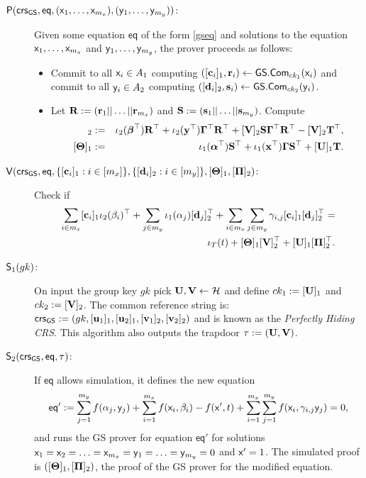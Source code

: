 \begin{description}
\item[$\mathsf{P}(\mathsf{crs}_{\mathsf{GS}},\mathsf{eq},(\mathsf{x}_1,\ldots,\mathsf{x}_{m_x}),(\mathsf{y}_1,\ldots,\mathsf{y}_{m_y}))$:] Given some equation $\mathsf{eq}$ of the form \ref{gseq} and solutions to the equation
$\mathsf{x}_1,\ldots,\mathsf{x}_{m_x}$ and $\mathsf{y}_1,\ldots,\mathsf{y}_{m_y}$, the prover proceeds as follows:
\begin{itemize}
\item Commit to all $\mathsf{x}_i \in A_1$ computing $([\mathbf{c}_i]_1,\mathbf{r}_i)\gets{\mathsf{GS}}.\mathsf{Com}_{ck_1}(\mathsf{x}_i)$ and commit to all $\mathsf{y}_i \in A_2$ computing $([\mathbf{d}_i]_2,\mathbf{s}_i)\gets{\mathsf{GS}}.\mathsf{Com}_{ck_2}(\mathsf{y}_i)$.
\item Let $\mathbf{{R}} := (\mathbf{r}_1||\ldots||\mathbf{r}_{m_x})$ and $\mathbf{{S}} := (\mathbf{s}_1||\ldots||\mathbf{s}_{m_y})$. Compute 
\begin{eqnarray*}
[\matr{\Pi}]_2 
& := & \iota_2(\boldsymbol \beta^{\top}) \matr{R}^\top +\iota_2(\vecb{y}^{\top}) \matr{\EscQE}^\top  \matr{R}^{\top}+
[\matr{V}]_2\matr{S} \matr{\EscQE}^\top \matr{R}^\top - [\matr{V}]_2 \matr{T}^\top,\\
\  [\matr{\Theta}]_1 &  := &\iota_1(\boldsymbol \alpha^{\top}) \matr{S}^\top +\iota_1(\vecb{x}^{\top}) \matr{\EscQE} \matr{S}^{\top}+ [\matr{U}]_1 \matr{T}.
 \end{eqnarray*}
\end{itemize}
\item[{$\mathsf{V}(\mathsf{crs}_{\mathsf{GS}},\mathsf{eq},\{[\mathbf{c}_i]_1:i\in[m_x]\},\{[\mathbf{d}_i]_2:i\in[m_y]\},[\mathbf{{\Theta}}]_1,[\mathbf{{\Pi}}]_2)$}:] Check if
\begin{eqnarray*}
\sum_{i \in m_x} [\mathbf{c}_i]_1 \iota_2(\beta_i)^{\top} + \sum_{j \in m_y} \iota_1(\alpha_j) [\mathbf{d}_j]_2^{\top} 
+ \sum_{i \in m_x}\sum_{j \in m_y}\gamma_{i,j} [\mathbf{c}_i]_1 [\mathbf{d}_j]_2^{\top} = \\ \iota_T(t) +[\mathbf{{\Theta}}]_1[\mathbf{{V}}]_2^\top + [\mathbf{{U}}]_1[\mathbf{{\Pi}}]_2^\top.
\end{eqnarray*}
\item[$\mathsf{S}_1(gk)$:]  On input the group key $gk$ pick $\mathbf{{U}},\mathbf{{V}}\gets\mathcal{H}$ and define $ck_1 := [\mathbf{{U}}]_1$ and $ck_2:=[\mathbf{{V}}]_2$.
   The common reference string is:
   $\mathsf{crs}_{\mathsf{GS}}:=(gk,[\mathbf{u}_1]_1,[\mathbf{u}_2]_1,[\mathbf{v}_1]_2,[\mathbf{v}_2]_2)$ and is known as the \emph{Perfectly Hiding CRS}. This algorithm also outputs the trapdoor $\tau:=(\mathbf{{U}},\mathbf{{V}})$.
\item[$\mathsf{S}_2(\mathsf{crs}_{\mathsf{GS}},\mathsf{eq},\tau)$:] If $\mathsf{eq}$ allows simulation, it defines the new equation
\begin{equation}
\mathsf{eq}':=\sum_{j=1}^{m_y} f(\alpha_j, \mathsf{y}_j)+\sum_{i=1}^{m_x} f(\mathsf{x}_i, \beta_i)-f(\mathsf{x}',t)+\sum_{i=1}^{m_x} \sum_{j=1}^{m_y}  f(\mathsf{x}_i,\gamma_{i,j} \mathsf{y}_j)=0,
\end{equation}
and runs the GS prover for equation $\mathsf{eq}'$ for solutions $\mathsf{x}_1=\mathsf{x}_2=\ldots=\mathsf{x}_{m_x}=\mathsf{y}_1=\ldots=\mathsf{y}_{m_y}=0$ and $\mathsf{x}'=1$. The simulated proof is $([\mathbf{{\Theta}}]_1,[\mathbf{{\Pi}}]_2)$, the proof of the GS prover for the modified equation.

\end{description}
